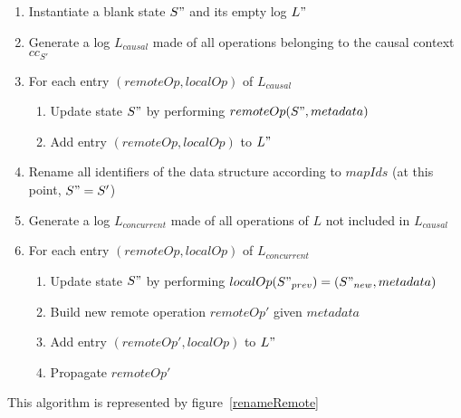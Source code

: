 \documentclass[a4paper]{article}
\begin{document}
\begin{enumerate}
  \item Instantiate a blank state $S"$ and its empty log $L"$
  \item Generate a log $L_{causal}$
    made of all operations belonging to the causal context $cc_{S'}$
  \item For each entry $(remoteOp, localOp)$ of $L_{causal}$
  \begin{enumerate}
    \item Update state $S"$ by performing  $remoteOp(S", metadata)$
    \item Add entry $(remoteOp, localOp)$ to $L"$
  \end{enumerate}
  \item Rename all identifiers of the data structure according to $mapIds$ (at this point, $S" = S'$)
  \item Generate a log $L_{concurrent}$ made of all operations of $L$ not included in $L_{causal}$
  \item For each entry $(remoteOp, localOp)$ of $L_{concurrent}$
  \begin{enumerate}
    \item Update state $S"$ by performing $localOp(S"_{prev}) = (S"_{new}, metadata)$
    \label{itm:replay-local-op}
    \item Build new remote operation $remoteOp'$ given $metadata$
    \label{itm:regenerate-remote-op}
    \item Add entry $(remoteOp', localOp)$ to $L"$
    \item Propagate $remoteOp'$
  \end{enumerate}
\end{enumerate}

This algorithm is represented by figure~\ref{renameRemote}
\end{document}
